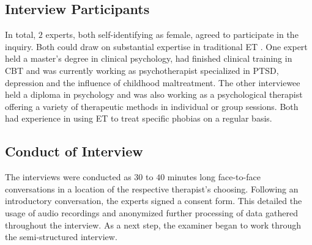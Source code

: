 \subsection{Interview Participants}
In total, $2$ experts, both self-identifying as female, agreed to participate in the inquiry. Both could draw on substantial expertise in traditional \ac{ET}%
. One expert held a master's degree in clinical psychology, had finished clinical training in \ac{CBT} and was currently working as psychotherapist specialized in \ac{PTSD}, depression and the influence of childhood maltreatment. The other interviewee held a diploma in psychology and was also working as a psychological therapist offering a variety of therapeutic methods in individual or group sessions. Both had experience in using \ac{ET} %
to treat specific phobias on a regular basis.

\subsection{Conduct of Interview}
The interviews were conducted as $30$ to $40$ minutes long face-to-face conversations in a location of the respective therapist's choosing. %
Following an introductory conversation, the experts signed a consent form. This detailed the usage of audio recordings and anonymized further processing of data gathered throughout the interview. As a next step, the examiner began to work through the semi-structured interview.%

